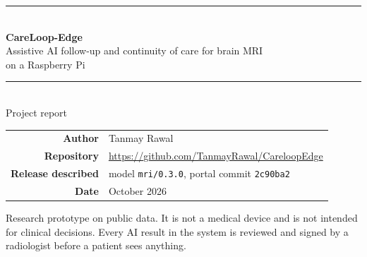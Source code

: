 \documentclass[11pt,a4paper]{article}
\begin{document}
\begin{titlepage}
\centering
\vspace*{2.5cm}
{\color{accent}\rule{\linewidth}{1.2pt}}\\[14pt]
{\Huge\bfseries CareLoop-Edge}\\[8pt]
{\Large Assistive AI follow-up and continuity of care for brain MRI\\ on a Raspberry Pi}\\[10pt]
{\color{accent}\rule{\linewidth}{1.2pt}}\\[30pt]
{\large Project report}\\[60pt]
\begin{tabular}{rl}
\textbf{Author} & Tanmay Rawal \\
\textbf{Repository} & \url{https://github.com/TanmayRawal/CareloopEdge} \\
\textbf{Release described} & model \texttt{mri/0.3.0}, portal commit \texttt{2c90ba2} \\
\textbf{Date} & October 2026 \\
\end{tabular}
\vfill
{\small\color{muted} Research prototype on public data. It is not a medical device and is not intended for clinical decisions.
Every AI result in the system is reviewed and signed by a radiologist before a patient sees anything.}
\end{titlepage}

\begin{abstract}
\noindent CareLoop-Edge is a brain-MRI decision-support and follow-up system that runs entirely on a Raspberry Pi in a
clinic. A patient, or a health worker on their behalf, uploads a single image or a whole MRI study. A quantised
ResNet-50 classifier with a segmentation head analyses it on the device. The result goes to a radiologist's worklist
with calibrated probabilities, a 95\% prediction set, an exact lesion-focused Grad-CAM explanation and the lesion
outline. The radiologist signs the report and chooses the next step (consultation, repeat MRI or referral). The
care-loop part of the system then makes sure that step happens: appointment booking, reminders, a risk-ranked
follow-up worklist for the coordinator, referral tracking and analytics on loop closure.

The model is trained on a PC, audited for data leakage, quantised to INT8, and reaches the device as a signed and
encrypted bundle from a self-hosted registry. Patient data is encrypted at rest and every access is written to a
tamper-evident audit log. After feedback from a radiologist that diagnosis is made from the whole study, the model was
evaluated on complete 3D patient scans, retrained, and released as \texttt{mri/0.3.0}. On held-out patients it
reaches a tumour-type macro-F1 of 0.98, a slice-level tumour AUROC of 0.95 and a 5\% false-alarm rate on healthy
volunteers, meeting all three pre-registered targets.
\end{abstract}
\end{document}
